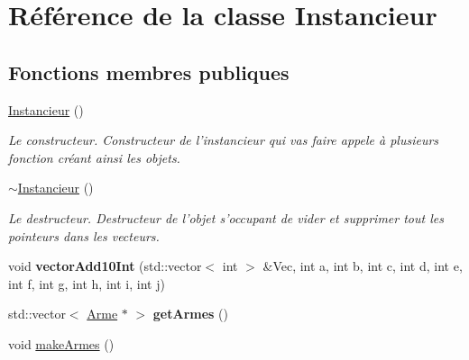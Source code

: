 \hypertarget{classInstancieur}{\section{Référence de la classe Instancieur}
\label{classInstancieur}
}
\subsection*{Fonctions membres publiques}
\begin{DoxyCompactItemize}
\item 
\hypertarget{classInstancieur_ac5eee975392cb87bfabc5b4df6ebc077}{\hyperlink{classInstancieur_ac5eee975392cb87bfabc5b4df6ebc077}{Instancieur} ()}\label{classInstancieur_ac5eee975392cb87bfabc5b4df6ebc077}

\begin{DoxyCompactList}\small\item\em Le constructeur. Constructeur de l'instancieur qui vas faire appele à plusieurs fonction créant ainsi les objets. \end{DoxyCompactList}\item 
\hypertarget{classInstancieur_aa09eb45321ccae26204e4a75964c8bfa}{\hyperlink{classInstancieur_aa09eb45321ccae26204e4a75964c8bfa}{$\sim$\-Instancieur} ()}\label{classInstancieur_aa09eb45321ccae26204e4a75964c8bfa}

\begin{DoxyCompactList}\small\item\em Le destructeur. Destructeur de l'objet s'occupant de vider et supprimer tout les pointeurs dans les vecteurs. \end{DoxyCompactList}\item 
\hypertarget{classInstancieur_a3d3e3a304329112d4092678bd81755bc}{void {\bfseries vector\-Add10\-Int} (std\-::vector$<$ int $>$ \&Vec, int a, int b, int c, int d, int e, int f, int g, int h, int i, int j)}\label{classInstancieur_a3d3e3a304329112d4092678bd81755bc}

\item 
\hypertarget{classInstancieur_af2506c3c13d9b69dd7abbaa033f53223}{std\-::vector$<$ \hyperlink{classArme}{Arme} $\ast$ $>$ {\bfseries get\-Armes} ()}\label{classInstancieur_af2506c3c13d9b69dd7abbaa033f53223}

\item 
\hypertarget{classInstancieur_acfc970b91c26ac5c29320f9d5ca73ee4}{void \hyperlink{classInstancieur_acfc970b91c26ac5c29320f9d5ca73ee4}{make\-Armes} ()}\label{classInstancieur_acfc970b91c26ac5c29320f9d5ca73ee4}


\end{DoxyCompactItemize}
